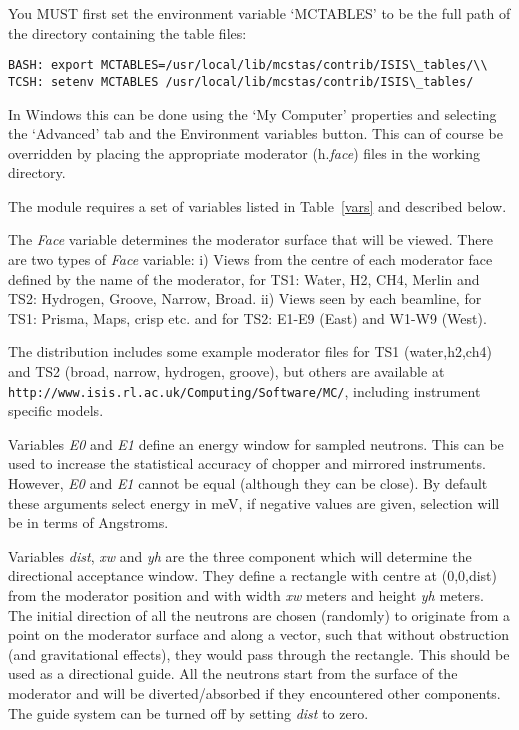 You MUST first set the environment variable `MCTABLES' to be the
full path of the directory containing the table files:
\begin{lstlisting}
BASH: export MCTABLES=/usr/local/lib/mcstas/contrib/ISIS\_tables/\\
TCSH: setenv MCTABLES /usr/local/lib/mcstas/contrib/ISIS\_tables/
\end{lstlisting}
In Windows this can be done using the `My Computer' properties and
selecting the `Advanced' tab and the Environment variables button.
This can of course be overridden by placing the appropriate moderator (h.{\it{face}}) files in the
working directory.

The module requires a set of variables
listed in Table~\ref{vars} and described below.

The {\it Face} variable determines the moderator surface that will
be viewed. There are two types of {\it Face} variable: i)  Views
from the centre of each moderator face defined by the name of the
moderator, for TS1: Water, H2, CH4, Merlin and TS2: Hydrogen,
Groove, Narrow, Broad. ii) Views seen by each beamline, for TS1:
Prisma, Maps, crisp etc. and for TS2: E1-E9 (East) and W1-W9
(West).

The \MCS distribution includes some example moderator files for TS1 (water,h2,ch4) and TS2 (broad, narrow, hydrogen, groove), but others are available at \\ \verb+http://www.isis.rl.ac.uk/Computing/Software/MC/+, including instrument specific models.



Variables {\it E0} and {\it E1} define an energy window for sampled neutrons.
This can be used to increase the statistical
accuracy of chopper and mirrored instruments. However, {\it E0} and
{\it E1} cannot be equal (although they can be close). By default these arguments
select energy in meV, if negative values are given, selection will be in terms of Angstroms.

Variables {\it dist}, {\it xw} and {\it yh} are the three
component which will determine the directional acceptance window.
They define a rectangle with centre at (0,0,dist) from the
moderator position and with width {\it xw} meters and height {\it yh} meters.
The initial direction of all the neutrons are chosen (randomly) to
originate from a point on the moderator surface and along a
vector, such that without obstruction (and gravitational effects),
they would pass through the rectangle. This should be used as a
directional guide. All the neutrons start from the surface of the
moderator and will be diverted/absorbed if they encountered other
components. The guide system can be turned off by setting {\it
dist} to zero.


